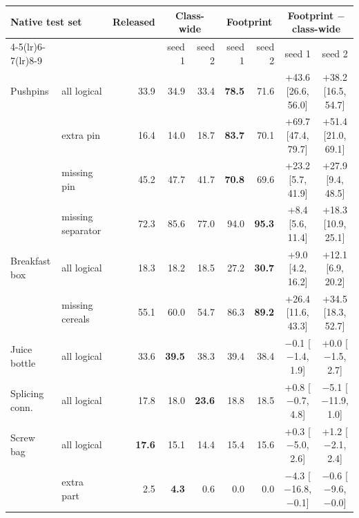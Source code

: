 \begin{tabular}{llrrrrrcc}
\toprule
\multicolumn{2}{l}{Native test set} & Released & \multicolumn{2}{c}{Class-wide} & \multicolumn{2}{c}{Footprint} & \multicolumn{2}{c}{Footprint $-$ class-wide} \\
\cmidrule(lr){4-5}\cmidrule(lr){6-7}\cmidrule(lr){8-9}
 & & & seed 1 & seed 2 & seed 1 & seed 2 & seed 1 & seed 2 \\
\midrule
Pushpins & all logical & 33.9 & 34.9 & 33.4 & \textbf{78.5} & 71.6 & +43.6 [26.6, 56.0] & +38.2 [16.5, 54.7] \\
 & extra pin & 16.4 & 14.0 & 18.7 & \textbf{83.7} & 70.1 & +69.7 [47.4, 79.7] & +51.4 [21.0, 69.1] \\
 & missing pin & 45.2 & 47.7 & 41.7 & \textbf{70.8} & 69.6 & +23.2 [5.7, 41.9] & +27.9 [9.4, 48.5] \\
 & missing separator & 72.3 & 85.6 & 77.0 & 94.0 & \textbf{95.3} & +8.4 [5.6, 11.4] & +18.3 [10.9, 25.1] \\
\midrule
Breakfast box & all logical & 18.3 & 18.2 & 18.5 & 27.2 & \textbf{30.7} & +9.0 [4.2, 16.2] & +12.1 [6.9, 20.2] \\
 & missing cereals & 55.1 & 60.0 & 54.7 & 86.3 & \textbf{89.2} & +26.4 [11.6, 43.3] & +34.5 [18.3, 52.7] \\
\midrule
Juice bottle & all logical & 33.6 & \textbf{39.5} & 38.3 & 39.4 & 38.4 & $-$0.1 [$-$1.4, 1.9] & +0.0 [$-$1.5, 2.7] \\
\midrule
Splicing conn. & all logical & 17.8 & 18.0 & \textbf{23.6} & 18.8 & 18.5 & +0.8 [$-$0.7, 4.8] & $-$5.1 [$-$11.9, 1.0] \\
\midrule
Screw bag & all logical & \textbf{17.6} & 15.1 & 14.4 & 15.4 & 15.6 & +0.3 [$-$5.0, 2.6] & +1.2 [$-$2.1, 2.4] \\
 & extra part & 2.5 & \textbf{4.3} & 0.6 & 0.0 & 0.0 & $-$4.3 [$-$16.8, $-$0.1] & $-$0.6 [$-$9.6, $-$0.0] \\
\bottomrule
\end{tabular}
